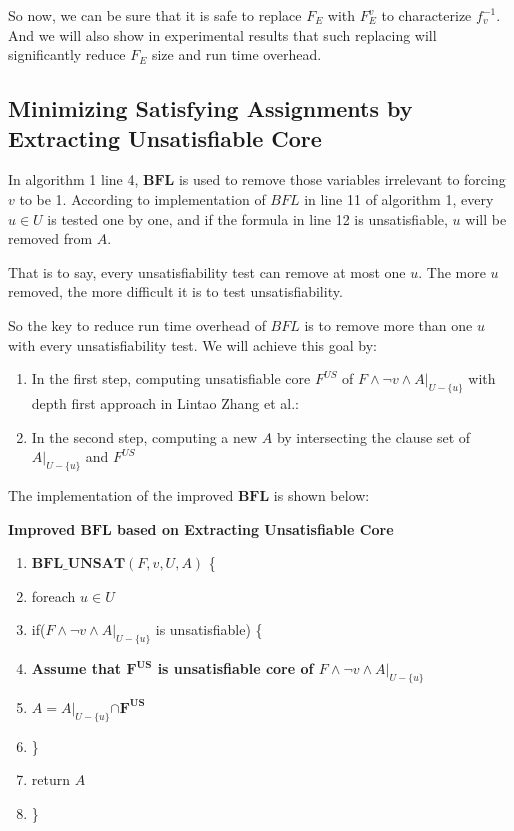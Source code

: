 \documentclass[journal]{IEEEtran}
\begin{document}
So now,
we can be sure that it is safe to replace $F_E$ with $F_E^v$ to characterize $f^{-1}_v$.
And we will also show in experimental results that such replacing will significantly reduce $F_E$ size and run time overhead.

\subsection{Minimizing Satisfying Assignments by Extracting Unsatisfiable Core}\label{subsec_bfl}

In algorithm 1 line 4,
$\boldsymbol{BFL}$ \cite{MINASS} is used to remove those variables irrelevant to forcing $v$ to be 1.
According to implementation of $BFL$ in line 11 of algorithm 1,
every $u\in U$ is tested one by one,
and if the formula in line 12 is unsatisfiable,
$u$ will be removed from $A$.

That is to say,
every unsatisfiability test can remove at most one $u$.
The more $u$ removed,
the more difficult it is to test unsatisfiability.

So the key to reduce run time overhead of $BFL$ is to remove more than one $u$ with every unsatisfiability test.
We will achieve this goal by:
\begin{enumerate}
\item In the first step,
computing unsatisfiable core $F^{US}$ of $F\wedge \neg v\wedge A|_{U -\{u\}}$ with depth first approach in Lintao Zhang et al.\cite{VALIDSAT}:
\item In the second step,
computing a new $A$ by intersecting the clause set of $A|_{U-\{u\}}$ and $F^{US}$
\end{enumerate}

The implementation of the improved $\boldsymbol{BFL}$ is shown below:
\vspace{0.2cm}
\begin{algo}
\textbf{Improved $\boldsymbol{BFL}$ based on Extracting Unsatisfiable Core}
\begin{enumerate}
\item $\boldsymbol{BFL\_UNSAT}(F,v,U,A)$ \{
\item \hspace{0.3cm} foreach $u\in U$
\item \hspace{0.6cm}  if($F\wedge \neg v\wedge A|_{U -\{u\}}$ is unsatisfiable) \{
\item \hspace{0.9cm}     \textbf{Assume that $\boldsymbol{F^{US}}$ is unsatisfiable core of $F\wedge \neg v\wedge A|_{U -\{u\}}$}
\item \hspace{0.9cm}     $A= A|_{U -\{u\}}\boldsymbol{\cap F^{US}}$
\item \hspace{0.6cm} \}
\item \hspace{0.3cm} return $A$
\item \}
\end{enumerate}
\end{algo}
\end{document}

